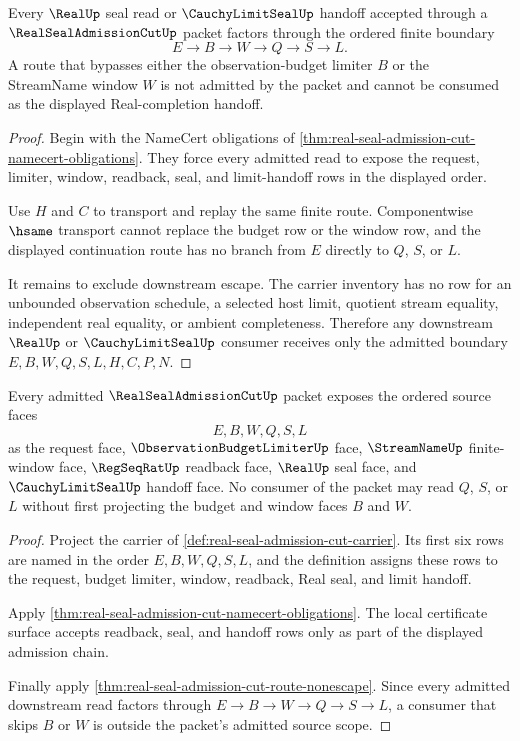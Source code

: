 \begin{theorem}
\label{thm:real-seal-admission-cut-route-nonescape}
Every $\RealUp$ seal read or $\CauchyLimitSealUp$ handoff accepted through a $\RealSealAdmissionCutUp$ packet factors through the ordered finite boundary
$$
E \to B \to W \to Q \to S \to L .
$$
A route that bypasses either the observation-budget limiter $B$ or the StreamName window $W$ is not admitted by the packet and cannot be consumed as the displayed Real-completion handoff.
\end{theorem}
\begin{proof}
Begin with the NameCert obligations of \autoref{thm:real-seal-admission-cut-namecert-obligations}. They force every admitted read to expose the request, limiter, window, readback, seal, and limit-handoff rows in the displayed order.

Use $H$ and $C$ to transport and replay the same finite route. Componentwise $\hsame$ transport cannot replace the budget row or the window row, and the displayed continuation route has no branch from $E$ directly to $Q$, $S$, or $L$.

It remains to exclude downstream escape. The carrier inventory has no row for an unbounded observation schedule, a selected host limit, quotient stream equality, independent real equality, or ambient completeness. Therefore any downstream $\RealUp$ or $\CauchyLimitSealUp$ consumer receives only the admitted boundary $E,B,W,Q,S,L,H,C,P,N$.
\end{proof}

\begin{theorem}
\label{thm:real-seal-admission-cut-source-scope}
Every admitted $\RealSealAdmissionCutUp$ packet exposes the ordered source faces
$$
E,B,W,Q,S,L
$$
as the request face, $\ObservationBudgetLimiterUp$ face, $\StreamNameUp$ finite-window face, $\RegSeqRatUp$ readback face, $\RealUp$ seal face, and $\CauchyLimitSealUp$ handoff face. No consumer of the packet may read $Q$, $S$, or $L$ without first projecting the budget and window faces $B$ and $W$.
\end{theorem}
\begin{proof}
Project the carrier of \autoref{def:real-seal-admission-cut-carrier}. Its first six rows are named in the order $E,B,W,Q,S,L$, and the definition assigns these rows to the request, budget limiter, window, readback, Real seal, and limit handoff.

Apply \autoref{thm:real-seal-admission-cut-namecert-obligations}. The local certificate surface accepts readback, seal, and handoff rows only as part of the displayed admission chain.

Finally apply \autoref{thm:real-seal-admission-cut-route-nonescape}. Since every admitted downstream read factors through $E \to B \to W \to Q \to S \to L$, a consumer that skips $B$ or $W$ is outside the packet's admitted source scope.
\end{proof}

